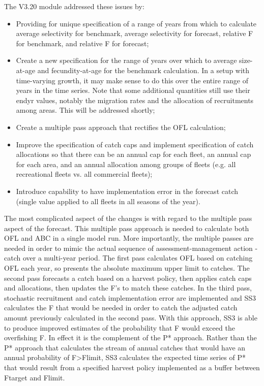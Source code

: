 The V3.20 module addressed these issues by:
\begin{itemize}
	\item Providing for unique specification of a range of years from which to calculate average selectivity for benchmark, average selectivity for forecast, relative F for benchmark, and relative F for forecast;
	\item Create a new specification for the range of years over which to average size-at-age and fecundity-at-age for the benchmark calculation.  In a setup with time-varying growth, it may make sense to do this over the entire range of years in the time series.  Note that some additional quantities still use their endyr values, notably the migration rates and the allocation of recruitments among areas.  This will be addressed shortly;
	\item Create a multiple pass approach that rectifies the OFL calculation;
	\item Improve the specification of catch caps and implement specification of catch allocations so that there can be an annual cap for each fleet, an annual cap for each area, and an annual allocation among groups of fleets (e.g. all recreational fleets vs. all commercial fleets);
	\item Introduce capability to have implementation error in the forecast catch (single value applied to all fleets in all seasons of the year).
\end{itemize}

The most complicated aspect of the changes is with regard to the multiple pass aspect of the forecast.  This multiple pass approach is needed to calculate both OFL and ABC in a single model run.  More importantly, the multiple passes are needed in order to mimic the actual sequence of assessment-management action - catch over a multi-year period.  The first pass calculates OFL based on catching OFL each year, so presents the absolute maximum upper limit to catches.  The second pass forecasts a catch based on a harvest policy, then applies catch caps and allocations, then updates the F's to match these catches.  In the third pass, stochastic recruitment and catch implementation error are implemented and SS3 calculates the F that would be needed in order to catch the adjusted catch amount previously calculated in the second pass.  With this approach, SS3 is able to produce improved estimates of the probability that F would exceed the overfishing F.  In effect it is the complement of the P* approach.  Rather than the P* approach that calculates the stream of annual catches that would have an annual probability of F>Flimit, SS3 calculates the expected time series of P* that would result from a specified harvest policy implemented as a buffer between Ftarget and Flimit.

